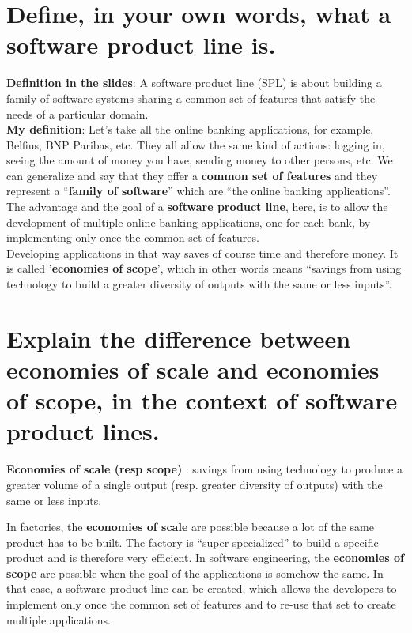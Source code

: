 \section{Define, in your own words, what a software product line is.}

\textbf{Definition in the slides}: A software product line (SPL) is about building a family of software systems sharing a common set of features that satisfy the needs of a particular domain. \\

\textbf{My definition}: Let’s take all the online banking applications, for example, Belfius, BNP Paribas, etc. They all allow the same kind of actions: logging in, seeing the amount of money you have, sending money to other persons, etc. We can generalize and say that they offer a \textbf{common set of features} and they represent a “\textbf{family of software}” which are “the online banking applications”. \\
The advantage and the goal of a \textbf{software product line}, here, is to allow the development of multiple online banking applications, one for each bank, by implementing only once the common set of features.\\

Developing applications in that way saves of course time and therefore money. It is called '\textbf{economies of scope}', which in other words means “savings from using technology to build a greater diversity of outputs with the same or less inputs”.

\section{Explain the difference between economies of scale and economies of scope, in the context
of software product lines.}


\textbf{Economies of scale (resp scope)} : savings from using technology to produce a greater volume  of a single output (resp. greater diversity of outputs) with the same or less inputs.

In factories, the \textbf{economies of scale} are possible because a lot of the same product has to be built. The factory is “super specialized” to build a specific product and is therefore very efficient.
In software engineering, the \textbf{economies of scope} are possible when the goal of the applications is somehow the same. In that case, a software product line can be created, which allows the developers to implement only once the common set of features and to re-use that set to create multiple applications. \\

